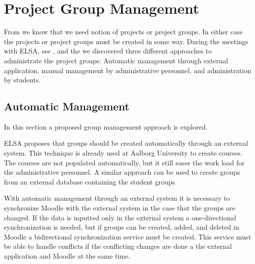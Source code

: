 \section{Project Group Management}
\label{sec:groupManagement}
\label{sec:projectgroupadministration}
From  we know that we need notion of projects or project groups. In either case the projects or project groups must be created in some way. 
During the meetings with ELSA,  see , and the \admpers{} we discovered three different approaches to administrate the project groups: Automatic management through external application, manual management by administrative personnel, and administration by students. 




\subsection{Automatic Management}
\label{sub:automanagement}
In this section a proposed group management approach is explored.  

ELSA proposes that groups should be created automatically through an external system. 
This technique is already used at Aalborg University to create courses. 
The courses are not populated automatically, but it still eases the work load for the administrative personnel.  
A similar approach can be used to create groups from an external database containing the student groups. 

With automatic management through an external system it is necessary to synchronize Moodle with the external system in the case that the groups are changed. 
If the data is inputted only in the external system a one-directional synchronization is needed, but if groups can be created, added, and deleted in Moodle a bidirectional synchronization service must be created. 
This service must be able to handle conflicts if the conflicting changes are done a the external application and Moodle at the same time.

